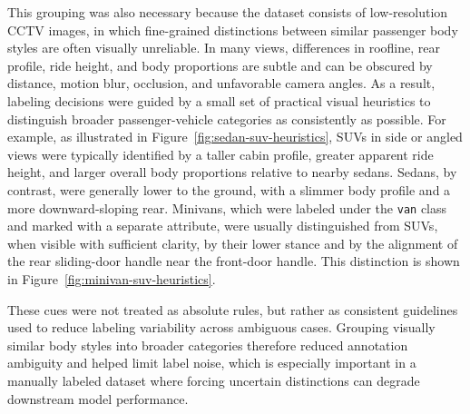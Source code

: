 This grouping was also necessary because the dataset consists of low-resolution
CCTV images, in which fine-grained distinctions between similar passenger body styles 
are often visually unreliable. In many views, differences in roofline, rear profile, 
ride height, and body proportions are subtle and can be obscured by distance, motion 
blur, occlusion, and unfavorable camera angles. As a result, labeling decisions were 
guided by a small set of practical visual heuristics to distinguish broader 
passenger-vehicle categories as consistently as possible.
For example, as illustrated in Figure~\ref{fig:sedan-suv-heuristics},
SUVs in side or angled views were typically identified by a taller cabin profile, 
greater apparent ride height, and larger overall body proportions relative to nearby 
sedans. Sedans, by contrast, were generally lower to the ground, with a slimmer body 
profile and a more downward-sloping rear.
Minivans, which were labeled under the \verb|van| class and marked with a separate 
attribute, were usually distinguished from SUVs, when visible with sufficient clarity, 
by their lower stance and by the alignment of the rear sliding-door handle near the 
front-door handle. This distinction is shown in Figure~\ref{fig:minivan-suv-heuristics}.

These cues were not treated as absolute rules, but rather as 
consistent guidelines used to reduce labeling variability across ambiguous cases. 
Grouping visually similar body styles into broader categories therefore reduced 
annotation ambiguity and helped limit label noise, which is especially important 
in a manually labeled dataset where forcing uncertain distinctions can degrade 
downstream model performance.


